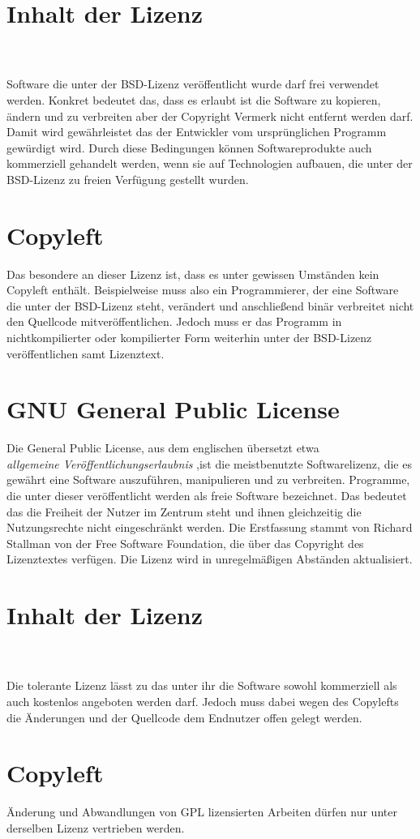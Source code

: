 \section*{Inhalt der Lizenz}
\\ \cite{BSDLicense}\\
Software die unter der BSD-Lizenz veröffentlicht wurde darf frei verwendet werden. Konkret bedeutet das, dass es erlaubt ist die Software zu kopieren, ändern und zu verbreiten aber der Copyright Vermerk nicht entfernt werden darf. Damit wird gewährleistet das der Entwickler vom ursprünglichen Programm gewürdigt wird. Durch diese Bedingungen können Softwareprodukte auch kommerziell gehandelt werden, wenn sie auf Technologien aufbauen, die unter der BSD-Lizenz zu freien Verfügung gestellt wurden.

\section*{Copyleft}
Das besondere an dieser Lizenz ist, dass es unter gewissen Umständen kein Copyleft enthält. Beispielweise muss also ein Programmierer, der eine Software die unter der BSD-Lizenz steht, verändert und anschließend binär verbreitet nicht den Quellcode mitveröffentlichen. Jedoch muss er das Programm in nichtkompilierter oder kompilierter Form weiterhin unter der BSD-Lizenz veröffentlichen samt Lizenztext.

\newpage
\section{GNU General Public License}\label{sec:GNU}
Die General Public License, aus dem englischen übersetzt etwa\\ \textit{allgemeine Veröffentlichungserlaubnis} ,ist die meistbenutzte Softwarelizenz, die es gewährt eine Software auszuführen, manipulieren und zu verbreiten. Programme, die unter dieser veröffentlicht werden als freie Software bezeichnet. Das bedeutet das die Freiheit der Nutzer im Zentrum steht und ihnen gleichzeitig die Nutzungsrechte nicht eingeschränkt werden. Die Erstfassung stammt von Richard Stallman von der Free Software Foundation, die über das Copyright des Lizenztextes verfügen. Die Lizenz wird in unregelmäßigen Abständen aktualisiert.

\section*{Inhalt der Lizenz}
\\ \cite{GNULicense} \\
Die tolerante Lizenz lässt zu das unter ihr die Software sowohl kommerziell als auch kostenlos angeboten werden darf. Jedoch muss dabei wegen des Copylefts die Änderungen und der Quellcode dem Endnutzer offen gelegt werden. 

\section*{Copyleft}
Änderung und Abwandlungen von GPL lizensierten Arbeiten dürfen nur unter derselben Lizenz vertrieben werden.

